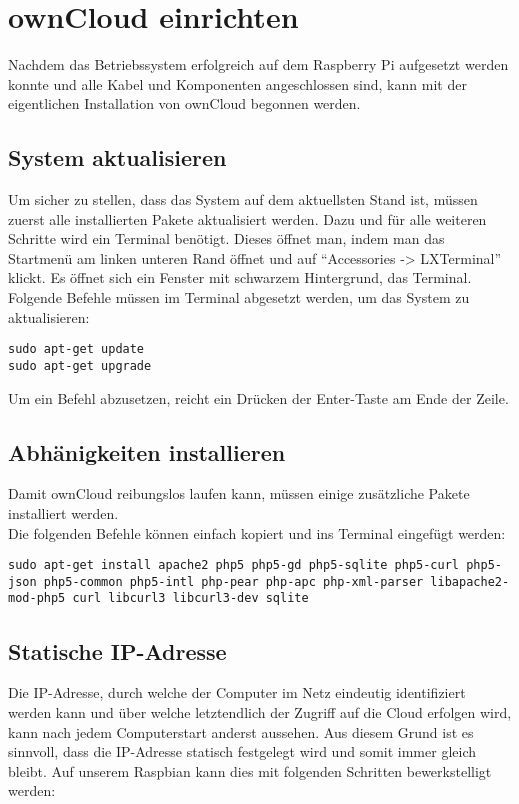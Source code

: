 \section{ownCloud einrichten}
Nachdem das Betriebssystem erfolgreich auf dem Raspberry Pi aufgesetzt werden konnte und alle Kabel und Komponenten angeschlossen sind, kann mit der eigentlichen Installation von ownCloud begonnen werden.

\subsection{System aktualisieren}
Um sicher zu stellen, dass das System auf dem aktuellsten Stand ist, müssen zuerst alle installierten Pakete aktualisiert werden.
Dazu und für alle weiteren Schritte wird ein Terminal benötigt. Dieses öffnet man, indem man das Startmenü am linken unteren Rand öffnet und auf ``Accessories -> LXTerminal'' klickt. Es öffnet sich ein Fenster mit schwarzem Hintergrund, das Terminal.
\\
Folgende Befehle müssen im Terminal abgesetzt werden, um das System zu aktualisieren:
\begin{lstlisting}
sudo apt-get update
sudo apt-get upgrade
\end{lstlisting}

Um ein Befehl abzusetzen, reicht ein Drücken der Enter-Taste am Ende der Zeile.

\subsection{Abhänigkeiten installieren}
Damit ownCloud reibungslos laufen kann, müssen einige zusätzliche Pakete installiert werden.
\\
Die folgenden Befehle können einfach kopiert und ins Terminal eingefügt werden:

\begin{lstlisting}
sudo apt-get install apache2 php5 php5-gd php5-sqlite php5-curl php5-json php5-common php5-intl php-pear php-apc php-xml-parser libapache2-mod-php5 curl libcurl3 libcurl3-dev sqlite
\end{lstlisting}

\subsection{Statische IP-Adresse}
Die IP-Adresse, durch welche der Computer im Netz eindeutig identifiziert werden kann und über welche letztendlich der Zugriff auf die Cloud erfolgen wird, kann nach jedem Computerstart anderst aussehen.
Aus diesem Grund ist es sinnvoll, dass die IP-Adresse statisch festgelegt wird und somit immer gleich bleibt.
Auf unserem Raspbian kann dies mit folgenden Schritten bewerkstelligt werden:

